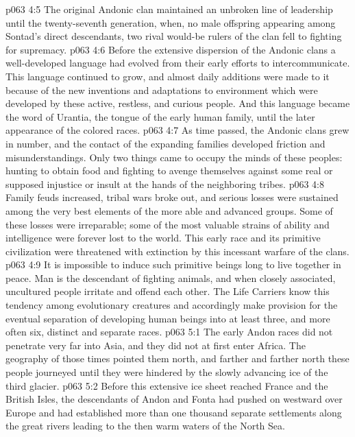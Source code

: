 \vs p063 4:5 \pc The original Andonic clan maintained an unbroken line of leadership until the twenty\hyp{}seventh generation, when, no male offspring appearing among Sontad’s direct descendants, two rival would\hyp{}be rulers of the clan fell to fighting for supremacy.
\vs p063 4:6 Before the extensive dispersion of the Andonic clans a well\hyp{}developed language had evolved from their early efforts to intercommunicate. This language continued to grow, and almost daily additions were made to it because of the new inventions and adaptations to environment which were developed by these active, restless, and curious people. And this language became the word of Urantia, the tongue of the early human family, until the later appearance of the colored races.
\vs p063 4:7 \pc As time passed, the Andonic clans grew in number, and the contact of the expanding families developed friction and misunderstandings. Only two things came to occupy the minds of these peoples: hunting to obtain food and fighting to avenge themselves against some real or supposed injustice or insult at the hands of the neighboring tribes.
\vs p063 4:8 Family feuds increased, tribal wars broke out, and serious losses were sustained among the very best elements of the more able and advanced groups. Some of these losses were irreparable; some of the most valuable strains of ability and intelligence were forever lost to the world. This early race and its primitive civilization were threatened with extinction by this incessant warfare of the clans.
\vs p063 4:9 It is impossible to induce such primitive beings long to live together in peace. Man is the descendant of fighting animals, and when closely associated, uncultured people irritate and offend each other. The Life Carriers know this tendency among evolutionary creatures and accordingly make provision for the eventual separation of developing human beings into at least three, and more often six, distinct and separate races.
\vs p063 5:1 The early Andon races did not penetrate very far into Asia, and they did not at first enter Africa. The geography of those times pointed them north, and farther and farther north these people journeyed until they were hindered by the slowly advancing ice of the third glacier.
\vs p063 5:2 Before this extensive ice sheet reached France and the British Isles, the descendants of Andon and Fonta had pushed on westward over Europe and had established more than one thousand separate settlements along the great rivers leading to the then warm waters of the North Sea.
